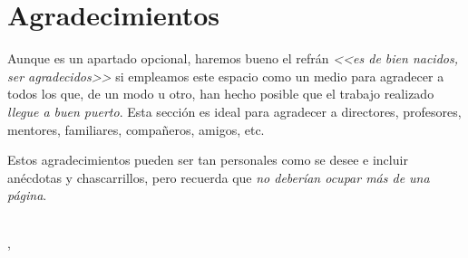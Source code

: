 \ifspanish
\else
\fi


%
%
\chapter*{Agradecimientos} %

 Aunque es un apartado opcional, haremos bueno el refrán \emph{<<es de bien nacidos, ser agradecidos>>} si empleamos este espacio como un medio para agradecer a todos los que, de un modo u otro, han hecho posible que el trabajo realizado \emph{llegue a buen puerto}. Esta sección es ideal para agradecer a directores, profesores, mentores, familiares, compañeros, amigos, etc. 
 
 Estos agradecimientos pueden ser tan personales como se desee e incluir anécdotas y chascarrillos, pero recuerda que \emph{no deberían ocupar más de una página}.

\makeatletter		
\begin{flushright}
	\vspace{1,5cm}
	\textit{\@autor}\\
	\@cityTF, \@yearTF
\end{flushright}
\makeatother